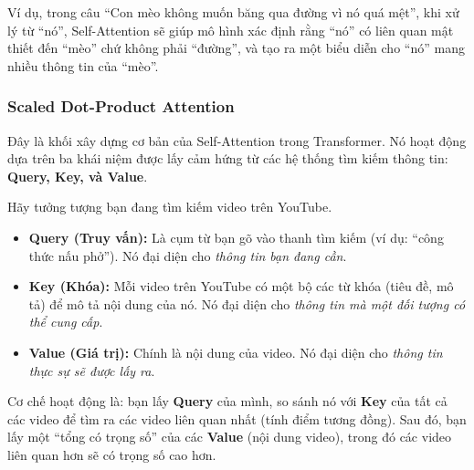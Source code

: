 Ví dụ, trong câu “Con mèo không muốn băng qua đường vì nó quá mệt”, khi xử lý từ “nó”, Self-Attention sẽ giúp mô hình xác định rằng “nó” có liên quan mật thiết đến “mèo” chứ không phải “đường”, và tạo ra một biểu diễn cho “nó” mang nhiều thông tin của “mèo”.

\subsubsection{Scaled Dot-Product Attention}
Đây là khối xây dựng cơ bản của Self-Attention trong Transformer. Nó hoạt động dựa trên ba khái niệm được lấy cảm hứng từ các hệ thống tìm kiếm thông tin: \textbf{Query, Key, và Value}.

\begin{tcolorbox}[
    title={Trực giác về Query, Key, Value},
    colback=yellow!10!white, colframe=yellow!50!black, fonttitle=\bfseries
]
Hãy tưởng tượng bạn đang tìm kiếm video trên YouTube.
\begin{itemize}
    \item \textbf{Query (Truy vấn):} Là cụm từ bạn gõ vào thanh tìm kiếm (ví dụ: “công thức nấu phở”). Nó đại diện cho \textit{thông tin bạn đang cần}.
    \item \textbf{Key (Khóa):} Mỗi video trên YouTube có một bộ các từ khóa (tiêu đề, mô tả) để mô tả nội dung của nó. Nó đại diện cho \textit{thông tin mà một đối tượng có thể cung cấp}.
    \item \textbf{Value (Giá trị):} Chính là nội dung của video. Nó đại diện cho \textit{thông tin thực sự sẽ được lấy ra}.
\end{itemize}
Cơ chế hoạt động là: bạn lấy \textbf{Query} của mình, so sánh nó với \textbf{Key} của tất cả các video để tìm ra các video liên quan nhất (tính điểm tương đồng). Sau đó, bạn lấy một “tổng có trọng số” của các \textbf{Value} (nội dung video), trong đó các video liên quan hơn sẽ có trọng số cao hơn.
\end{tcolorbox}

